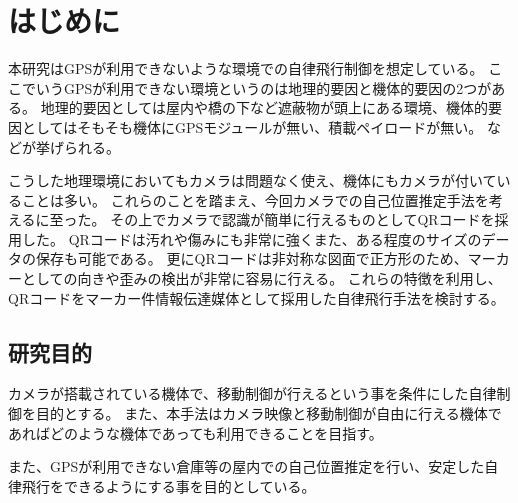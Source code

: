 \section{はじめに}
本研究はGPSが利用できないような環境での自律飛行制御を想定している。
ここでいうGPSが利用できない環境というのは地理的要因と機体的要因の2つがある。
地理的要因としては屋内や橋の下など遮蔽物が頭上にある環境、機体的要因としてはそもそも機体にGPSモジュールが無い、積載ペイロードが無い。
などが挙げられる。

こうした地理環境においてもカメラは問題なく使え、機体にもカメラが付いていることは多い。
これらのことを踏まえ、今回カメラでの自己位置推定手法を考えるに至った。
その上でカメラで認識が簡単に行えるものとしてQRコードを採用した。
QRコードは汚れや傷みにも非常に強くまた、ある程度のサイズのデータの保存も可能である。
更にQRコードは非対称な図面で正方形のため、マーカーとしての向きや歪みの検出が非常に容易に行える。
これらの特徴を利用し、QRコードをマーカー件情報伝達媒体として採用した自律飛行手法を検討する。

\subsection{研究目的}
カメラが搭載されている機体で、移動制御が行えるという事を条件にした自律制御を目的とする。
また、本手法はカメラ映像と移動制御が自由に行える機体であればどのような機体であっても利用できることを目指す。

また、GPSが利用できない倉庫等の屋内での自己位置推定を行い、安定した自律飛行をできるようにする事を目的としている。
